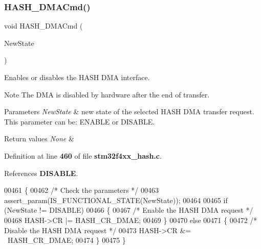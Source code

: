 \subsubsection{H\+A\+S\+H\+\_\+\+D\+M\+A\+Cmd()}
{\footnotesize\ttfamily void H\+A\+S\+H\+\_\+\+D\+M\+A\+Cmd (\begin{DoxyParamCaption}\item[{\textbf{ Functional\+State}}]{New\+State }\end{DoxyParamCaption})}



Enables or disables the H\+A\+SH D\+MA interface. 

\begin{DoxyNote}{Note}
The D\+MA is disabled by hardware after the end of transfer. 
\end{DoxyNote}

\begin{DoxyParams}{Parameters}
{\em New\+State} & new state of the selected H\+A\+SH D\+MA transfer request. This parameter can be\+: E\+N\+A\+B\+LE or D\+I\+S\+A\+B\+LE. \\
\hline
\end{DoxyParams}

\begin{DoxyRetVals}{Return values}
{\em None} & \\
\hline
\end{DoxyRetVals}


Definition at line \textbf{ 460} of file \textbf{ stm32f4xx\+\_\+hash.\+c}.



References \textbf{ D\+I\+S\+A\+B\+LE}.


\begin{DoxyCode}
00461 \{
00462   \textcolor{comment}{/* Check the parameters */}
00463   assert_param(IS_FUNCTIONAL_STATE(NewState));
00464 
00465   \textcolor{keywordflow}{if} (NewState != DISABLE)
00466   \{
00467     \textcolor{comment}{/* Enable the HASH DMA request */}
00468     HASH->CR |= HASH_CR_DMAE;
00469   \}
00470   \textcolor{keywordflow}{else}
00471   \{
00472     \textcolor{comment}{/* Disable the HASH DMA request */}
00473     HASH->CR &= ~HASH_CR_DMAE;
00474   \}
00475 \}
\end{DoxyCode}
